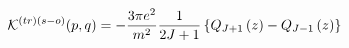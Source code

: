 \begin{equation}
\mathcal{K}^{\left( tr\right) \left( s-o\right) }(p,q)=-\frac{3\pi e^{2}}{%
m^{2}}\frac{1}{2J+1}\left\{ Q_{J+1}\left( z\right) -Q_{J-1}\left( z\right)
\right\}
\end{equation}

